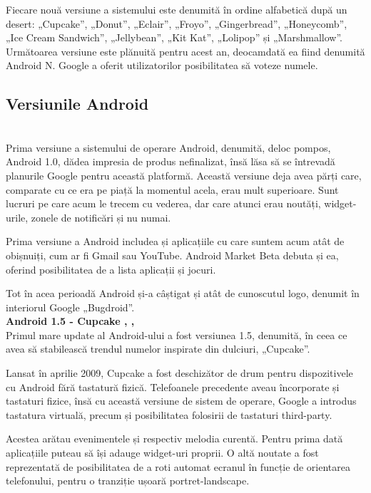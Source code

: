 \documentclass[12pt, a4paper, oneside]{article}
\begin{document}
Fiecare nouă versiune a sistemului este denumită în ordine alfabetică după un desert: „Cupcake”, „Donut”, „Eclair”, „Froyo”, „Gingerbread”, „Honeycomb”, „Ice Cream Sandwich”, „Jellybean”, „Kit Kat”, „Lolipop” și „Marshmallow”. Următoarea versiune este plănuită pentru acest an, deocamdată ea fiind denumită Android N. Google a oferit utilizatorilor posibilitatea să voteze numele.


\newpage
\subsection{Versiunile Android}
\\
Prima versiune a sistemului de operare Android, denumită, deloc pompos, Android 1.0, dădea impresia de produs nefinalizat, însă lăsa să se întrevadă planurile Google pentru această platformă. Această versiune deja avea părți care, comparate cu ce era  pe piață la momentul acela, erau mult superioare. Sunt lucruri pe care acum le trecem cu vederea, dar care atunci erau noutăți, widget-urile, zonele de notificări și nu numai. 

Prima versiune a Android includea și aplicațiile cu care suntem acum atât de obișnuiți, cum ar fi Gmail sau YouTube. Android Market Beta debuta și ea, oferind posibilitatea de a lista aplicații și jocuri.

Tot în acea perioadă Android și-a câștigat și atât de cunoscutul logo, denumit în interiorul Google „Bugdroid”.\\

\textbf{Android 1.5 - Cupcake \cite{AndroidVersionsHistory}, \cite{AndroidHistory}, \cite{DeveloperAndroid}}\\
Primul mare update al Android-ului a fost versiunea 1.5, denumită, în ceea ce avea să stabilească trendul numelor inspirate din dulciuri, „Cupcake”.

	Lansat în aprilie 2009, Cupcake a fost deschizător de drum pentru dispozitivele cu Android fără tastatură fizică. Telefoanele precedente aveau încorporate și tastaturi fizice, însă cu această versiune de sistem de operare, Google a introdus tastatura virtuală, precum și posibilitatea folosirii de tastaturi third-party.

	Acestea arătau evenimentele și respectiv melodia curentă. Pentru prima dată aplicațiile puteau să își adauge widget-uri proprii. O altă noutate a fost reprezentată de posibilitatea de a roti automat ecranul în funcție de orientarea telefonului, pentru o tranziție ușoară portret-landscape.\\
\end{document}
